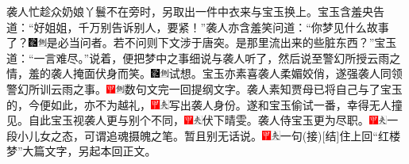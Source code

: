 袭人忙趁众奶娘丫鬟不在旁时，另取出一件中衣来与宝玉换上。宝玉含羞央告道：``好姐姐，千万别告诉别人，要紧！''袭人亦含羞笑问道：``你梦见什么故事了？{\includegraphics[width=3mm]{../Images/00006}\includegraphics[width=3mm]{../Images/00011}\footnotesize \kaishu 是必当问者。若不问则下文涉于唐突。}是那里流出来的些脏东西？''宝玉道：``一言难尽。''说着，便把梦中之事细说与袭人听了，然后说至警幻所授云雨之情，羞的袭人掩面伏身而笑。{\includegraphics[width=3mm]{../Images/00006}\includegraphics[width=3mm]{../Images/00011}\footnotesize \kaishu 试想。}宝玉亦素喜袭人柔媚姣俏，遂强袭人同领警幻所训云雨之事。{\includegraphics[width=3mm]{../Images/00002}\includegraphics[width=3mm]{../Images/00011}\footnotesize \kaishu 数句文完一回提纲文字。}袭人素知贾母已将自己与了宝玉的，今便如此，亦不为越礼，{\includegraphics[width=3mm]{../Images/00002}\includegraphics[width=3mm]{../Images/00012}\footnotesize \kaishu 写出袭人身份。}遂和宝玉偷试一番，幸得无人撞见。自此宝玉视袭人更与别个不同，{\includegraphics[width=3mm]{../Images/00002}\includegraphics[width=3mm]{../Images/00012}\footnotesize \kaishu 伏下晴雯。}袭人侍宝玉更为尽职。{\includegraphics[width=3mm]{../Images/00002}\includegraphics[width=3mm]{../Images/00012}\footnotesize \kaishu 一段小儿女之态，可谓追魂摄魄之笔。}暂且别无话说。{{\includegraphics[width=3mm]{../Images/00002}\includegraphics[width=3mm]{../Images/00012}\footnotesize \kaishu 一句{(接)}{[}结{]}住上回``红楼梦''大篇文字，另起本回正文。}}

